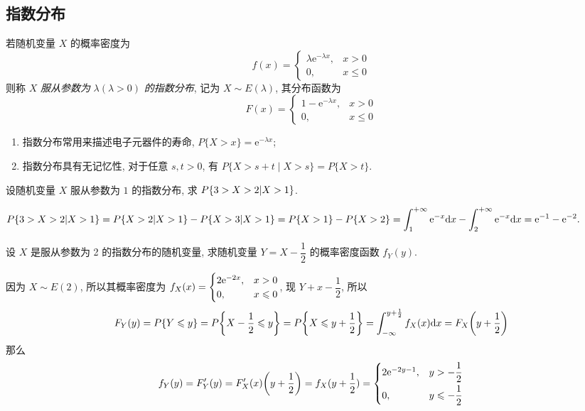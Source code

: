 \subsection{指数分布}

\begin{definition}[指数分布]
    若随机变量 $ X $ 的概率密度为
    $$f(x)=\begin{cases}
            \lambda \mathrm{e}^{-\lambda x}, & x>0           \\
            0,                               & x \leqslant 0
        \end{cases}$$
    则称 $ X $ \textit{服从参数为} $ \lambda(\lambda>0) $ \textit{的指数分布}, 记为 $ X \sim E(\lambda) $, 其分布函数为
    $$F(x)=\begin{cases}
            1-\mathrm{e}^{-\lambda x}, & x>0           \\
            0,                         & x \leqslant 0
        \end{cases}$$
    \begin{enumerate}[label=(\arabic{*})]
        \item 指数分布常用来描述电子元器件的寿命, $P\{X>x\}=\mathrm{e}^{-\lambda x} $;
        \item 指数分布具有无记忆性, 对于任意 $ s, t>0$, 有 $P\{X>s+t \mid X>s\}=P\{X>t\} .$
    \end{enumerate}
\end{definition}

\begin{example}
    设随机变量 $X$ 服从参数为 $1$ 的指数分布, 求 $P\qty{3>X>2|X>1}$.
\end{example}
\begin{solution}
    $\displaystyle P\qty{3>X>2|X>1}=P\qty{X>2|X>1}-P\qty{X>3|X>1}=P\qty{X>1}-P\qty{X>2}=\int_{1}^{+\infty} \mathrm{e} ^{-x} \dd x-\int_{2}^{+\infty} \mathrm{e} ^{-x} \dd x=\mathrm{e} ^{-1}-\mathrm{e} ^{-2}.$
\end{solution}

\begin{example}
    设 $X$ 是服从参数为 2 的指数分布的随机变量, 求随机变量 $Y=X-\dfrac{1}{2}$ 的概率密度函数 $f_Y(y).$
\end{example}
\begin{solution}
    因为 $X\sim E(2)$, 所以其概率密度为 $f_X(x)=\begin{cases}
            2\mathrm{e}^{-2x}, & x>0          \\
            0,         & x\leqslant 0
        \end{cases}$, 现 $Y+x-\dfrac{1}{2}$, 所以 $$F_Y(y)=P\qty{Y\leqslant y}=P\qty{X-\dfrac{1}{2}\leqslant y}=P\qty{X\leqslant y+\dfrac{1}{2}}=\int_{-\infty}^{y+\frac{1}{2}}f_X(x)\dd x=F_X\qty(y+\dfrac{1}{2})$$
    那么 $$f_Y(y)=F'_Y(y)=F'_X(x)\qty(y+\dfrac{1}{2})=f_X(y+\dfrac{1}{2})=\begin{cases}
            2\mathrm{e}^{-2y-1}, & y>-\dfrac{1}{2}          \\[6pt]
            0,           & y\leqslant -\dfrac{1}{2}
        \end{cases}$$
\end{solution}

